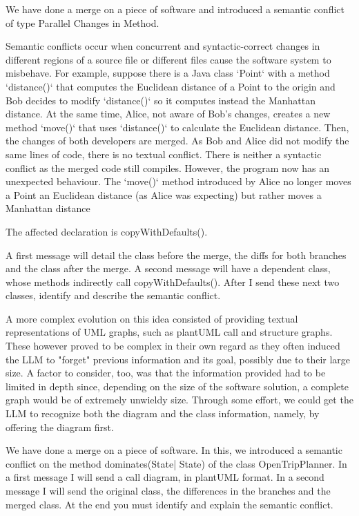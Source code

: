 \begin{prompt}
We have done a merge on a piece of software and introduced a semantic conflict of type Parallel Changes in Method.

Semantic conflicts occur when concurrent and syntactic-correct changes in different regions of a source file or different files cause the software system to misbehave. For example, suppose there is a Java class `Point` with a method `distance()` that computes the Euclidean distance of a Point to the origin and Bob decides to modify `distance()` so it computes instead the Manhattan distance. At the same time, Alice, not aware of Bob's changes, creates a new method `move()` that uses `distance()` to calculate the Euclidean distance. Then, the changes of both developers are merged. As Bob and Alice did not modify the same lines of code, there is no textual conflict. There is neither a syntactic conflict as the merged code still compiles. However, the program now has an unexpected behaviour. The `move()` method introduced by Alice no longer moves a Point an Euclidean distance (as Alice was expecting) but rather moves a Manhattan distance

The affected declaration is copyWithDefaults().

A first message will detail the class before the merge, the diffs for both branches and the class after the merge. A second message will have a dependent class, whose methods indirectly call copyWithDefaults(). After I send these next two classes, identify and describe the semantic conflict.    
\end{prompt}

A more complex evolution on this idea consisted of providing textual representations of UML graphs, such as plantUML call and structure graphs. These however proved to be complex in their own regard as they often induced the LLM to "forget" previous information and its goal, possibly due to their large size. A factor to consider, too, was that the information provided had to be limited in depth since, depending on the size of the software solution, a complete graph would be of extremely unwieldy size. Through some effort, we could get the LLM to recognize both the diagram and the class information, namely, by offering the diagram first.

\begin{prompt}
We have done a merge on a piece of software. In this, we introduced a semantic conflict on the method dominates(State| State) of the class OpenTripPlanner. In a first message I will send a call diagram, in plantUML format. In a second message I will send the original class, the differences in the branches and the merged class.  At the end you must identify and explain the semantic conflict.
\end{prompt}

